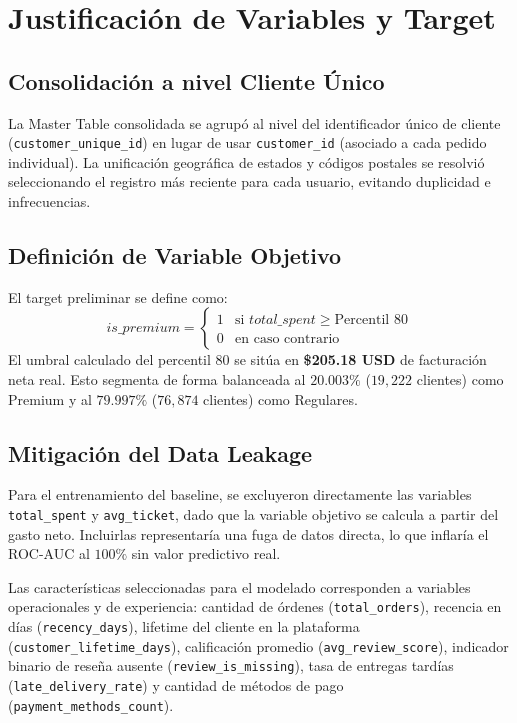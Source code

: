 \documentclass[journal,letterpaper]{IEEEtran}
\begin{document}
\section{Justificación de Variables y Target}
\subsection{Consolidación a nivel Cliente Único}
La Master Table consolidada se agrupó al nivel del identificador único de cliente (\texttt{customer\_unique\_id}) en lugar de usar \texttt{customer\_id} (asociado a cada pedido individual). La unificación geográfica de estados y códigos postales se resolvió seleccionando el registro más reciente para cada usuario, evitando duplicidad e infrecuencias.

\subsection{Definición de Variable Objetivo}
El target preliminar se define como:
\begin{equation}
is\_premium = \begin{cases} 
1 & \text{si } total\_spent \geq \text{Percentil 80} \\
0 & \text{en caso contrario}
\end{cases}
\end{equation}
El umbral calculado del percentil 80 se sitúa en \textbf{\$205.18 USD} de facturación neta real. Esto segmenta de forma balanceada al $20.003\%$ ($19,222$ clientes) como Premium y al $79.997\%$ ($76,874$ clientes) como Regulares.

\subsection{Mitigación del Data Leakage}
Para el entrenamiento del baseline, se excluyeron directamente las variables \texttt{total\_spent} y \texttt{avg\_ticket}, dado que la variable objetivo se calcula a partir del gasto neto. Incluirlas representaría una fuga de datos directa, lo que inflaría el ROC-AUC al $100\%$ sin valor predictivo real.

Las características seleccionadas para el modelado corresponden a variables operacionales y de experiencia: cantidad de órdenes (\texttt{total\_orders}), recencia en días (\texttt{recency\_days}), lifetime del cliente en la plataforma (\texttt{customer\_lifetime\_days}), calificación promedio (\texttt{avg\_review\_score}), indicador binario de reseña ausente (\texttt{review\_is\_missing}), tasa de entregas tardías (\texttt{late\_delivery\_rate}) y cantidad de métodos de pago (\texttt{payment\_methods\_count}).
\end{document}
